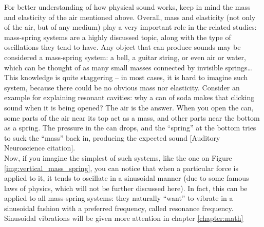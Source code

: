 For better understanding of how physical sound works, keep in mind the mass and elasticity of the air mentioned above. Overall, mass and elasticity (not only of the air, but of any medium) play a very important role in the related studies: mass-spring systems are a highly discussed topic, along with the type of oscillations they tend to have. Any object that can produce sounds may be considered a mass-spring system: a bell, a guitar string, or even air or water, which can be thought of as many small masses connected by invisible springs\dots{} This knowledge is quite staggering -- in most cases, it is hard to imagine such system, because there could be no obvious mass nor elasticity. Consider an example for explaining resonant cavities: why a can of soda makes that clicking sound when it is being opened? The air is the answer. When you open the can, some parts of the air near its top act as a mass, and other parts near the bottom as a spring. The pressure in the can drops, and the “spring” at the bottom tries to suck the “mass” back in, producing the expected sound [Auditory Neuroscience citation].\\

Now, if you imagine the simplest of such systems, like the one on Figure \ref{img:vertical_mass_spring}, you can notice that when a particular force is applied to it, it tends to oscillate in a sinusoidal manner (due to some famous laws of physics, which will not be further discussed here). In fact, this can be applied to all mass-spring systems: they naturally “want” to vibrate in a sinusoidal fashion with a preferred frequency, called resonance frequency. Sinusoidal vibrations will be given more attention in chapter \ref{chapter:math}\\

